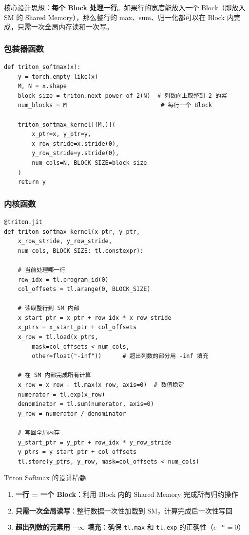 核心设计思想：\textbf{每个 Block 处理一行}。如果行的宽度能放入一个 Block（即放入 SM 的 Shared Memory），那么整行的 max、sum、归一化都可以在 Block 内完成，只需一次全局内存读和一次写。

\subsubsection{包装器函数}

\begin{lstlisting}[caption={Triton Softmax 包装器}]
def triton_softmax(x):
    y = torch.empty_like(x)
    M, N = x.shape
    block_size = triton.next_power_of_2(N)  # 列数向上取整到 2 的幂
    num_blocks = M                           # 每行一个 Block

    triton_softmax_kernel[(M,)](
        x_ptr=x, y_ptr=y,
        x_row_stride=x.stride(0),
        y_row_stride=y.stride(0),
        num_cols=N, BLOCK_SIZE=block_size
    )
    return y
\end{lstlisting}

\subsubsection{内核函数}

\begin{lstlisting}[caption={Triton Softmax 内核——每个 Block 处理一行}]
@triton.jit
def triton_softmax_kernel(x_ptr, y_ptr,
    x_row_stride, y_row_stride,
    num_cols, BLOCK_SIZE: tl.constexpr):

    # 当前处理哪一行
    row_idx = tl.program_id(0)
    col_offsets = tl.arange(0, BLOCK_SIZE)

    # 读取整行到 SM 内部
    x_start_ptr = x_ptr + row_idx * x_row_stride
    x_ptrs = x_start_ptr + col_offsets
    x_row = tl.load(x_ptrs,
        mask=col_offsets < num_cols,
        other=float("-inf"))      # 超出列数的部分用 -inf 填充

    # 在 SM 内部完成所有计算
    x_row = x_row - tl.max(x_row, axis=0)  # 数值稳定
    numerator = tl.exp(x_row)
    denominator = tl.sum(numerator, axis=0)
    y_row = numerator / denominator

    # 写回全局内存
    y_start_ptr = y_ptr + row_idx * y_row_stride
    y_ptrs = y_start_ptr + col_offsets
    tl.store(y_ptrs, y_row, mask=col_offsets < num_cols)
\end{lstlisting}

\begin{importantbox}{Triton Softmax 的设计精髓}
\begin{enumerate}
    \item \textbf{一行 = 一个 Block}：利用 Block 内的 Shared Memory 完成所有归约操作
    \item \textbf{只需一次全局读写}：整行数据一次性加载到 SM，计算完成后一次性写回
    \item \textbf{超出列数的元素用 $-\infty$ 填充}：确保 \texttt{tl.max} 和 \texttt{tl.exp} 的正确性（$e^{-\infty} = 0$）
\end{enumerate}
\end{importantbox}

